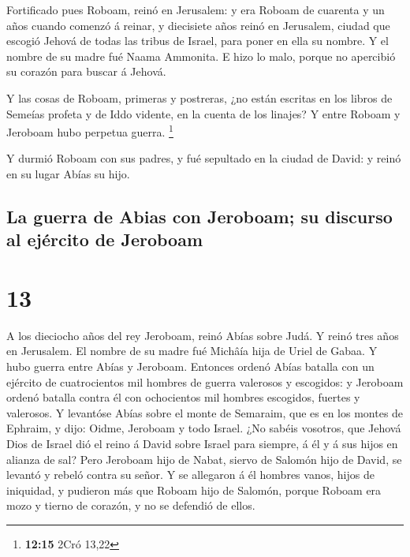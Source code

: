  Fortificado pues Roboam, reinó en Jerusalem: y era Roboam
de cuarenta y un años cuando comenzó á reinar, y diecisiete años reinó
en Jerusalem, ciudad que escogió Jehová de todas las tribus de Israel,
para poner en ella su nombre. Y el nombre de su madre fué Naama
Ammonita.  E hizo lo malo, porque no apercibió su corazón
para buscar á Jehová.

 Y las cosas de Roboam, primeras y postreras, ¿no están
escritas en los libros de Semeías profeta y de Iddo vidente, en la
cuenta de los linajes? Y entre Roboam y Jeroboam hubo perpetua guerra.
\footnote{\textbf{12:15} 2Cró 13,22}

 Y durmió Roboam con sus padres, y fué sepultado en la
ciudad de David: y reinó en su lugar Abías su hijo.

\hypertarget{la-guerra-de-abias-con-jeroboam-su-discurso-al-ejuxe9rcito-de-jeroboam}{%
\subsection{La guerra de Abias con Jeroboam; su discurso al ejército de
Jeroboam}\label{la-guerra-de-abias-con-jeroboam-su-discurso-al-ejuxe9rcito-de-jeroboam}}

\hypertarget{section-12}{%
\section{13}\label{section-12}}

 A los dieciocho años del rey Jeroboam, reinó Abías sobre
Judá.  Y reinó tres años en Jerusalem. El nombre de su madre
fué Michâía hija de Uriel de Gabaa. Y hubo guerra entre Abías y
Jeroboam.  Entonces ordenó Abías batalla con un ejército de
cuatrocientos mil hombres de guerra valerosos y escogidos: y Jeroboam
ordenó batalla contra él con ochocientos mil hombres escogidos, fuertes
y valerosos.  Y levantóse Abías sobre el monte de Semaraim,
que es en los montes de Ephraim, y dijo: Oidme, Jeroboam y todo Israel.
 ¿No sabéis vosotros, que Jehová Dios de Israel dió el reino
á David sobre Israel para siempre, á él y á sus hijos en alianza de sal?
 Pero Jeroboam hijo de Nabat, siervo de Salomón hijo de
David, se levantó y rebeló contra su señor.  Y se allegaron
á él hombres vanos, hijos de iniquidad, y pudieron más que Roboam hijo
de Salomón, porque Roboam era mozo y tierno de corazón, y no se defendió
de ellos.

